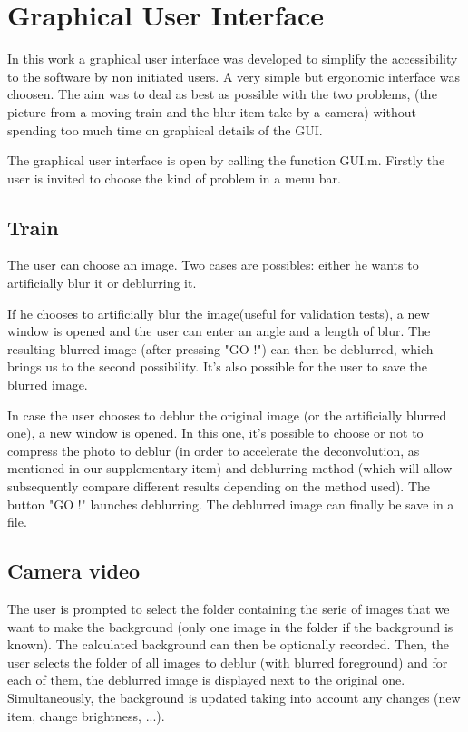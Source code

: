 
\chapter{Graphical User Interface}

In this work a graphical user interface was developed to simplify the accessibility to the software by non initiated users. A very simple but ergonomic interface was choosen. The aim was to deal as best as possible with the two problems, (the picture from a moving train and the blur item take by a camera) without spending too much time on graphical details of the GUI.


The graphical user interface is open by calling the function GUI.m. Firstly the user is invited to choose the kind of problem in a menu bar.


\section{Train}

The user can choose an image. Two cases are possibles: either he wants to artificially blur it or deblurring it. 

If he chooses to artificially blur the image(useful for validation tests), a new window is opened and the user can enter an angle and a length of blur. The resulting blurred image (after pressing "GO !") can then be deblurred, which brings us to the second possibility. It's also possible for the user to save the blurred image.

In case the user chooses to deblur the original image (or the artificially blurred one), a new window is opened. In this one, it's possible to choose or not to compress the photo to deblur (in order to accelerate the deconvolution,  as mentioned in our supplementary item) and deblurring method  (which will allow subsequently compare different results depending on the method used). The button "GO !" launches deblurring. The deblurred image can finally be save in a file.

\section{Camera video}

The user is prompted to select the folder containing the serie of images that we want to make the background (only one image in the folder if the background is known). The calculated background can then be optionally recorded.
Then, the user selects the folder of all images to deblur (with blurred foreground) and for each of them, the deblurred image is displayed next to the original one. Simultaneously, the background is updated taking into account any changes (new item, change brightness, ...).



